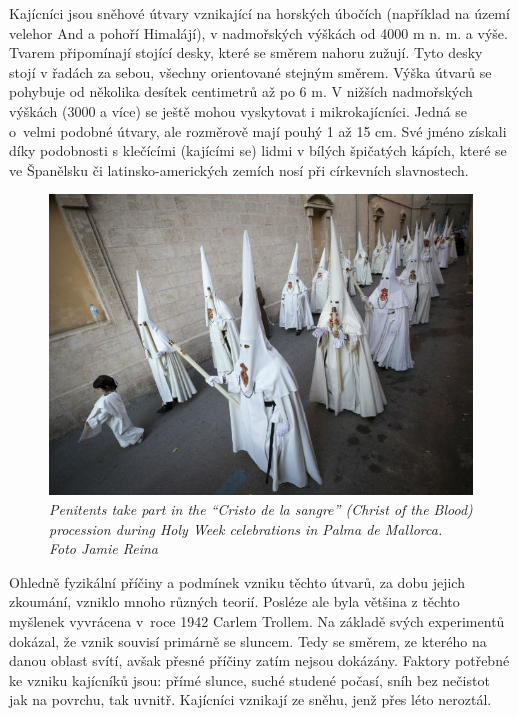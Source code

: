 Kajícníci jsou sněhové útvary vznikající na horských úbočích (například na území velehor And a pohoří Himalájí\cite{Betterton2000FormationOS}), v nadmořských výškách od 4000 m n. m. a výše\cite{lliboitry_1954}.  Tvarem připomínají stojící desky, které se směrem nahoru zužují. Tyto desky stojí v řadách za sebou, všechny orientované stejným směrem. Výška útvarů se pohybuje od několika desítek centimetrů až po 6 m. V nižších nadmořských výškách (3000 a více) se ještě mohou vyskytovat i mikrokajícníci. Jedná se o~velmi podobné útvary, ale rozměrově mají pouhý 1 až 15 cm. Své jméno získali díky podobnosti s klečícími (kajícími se) lidmi v bílých špičatých kápích, které se ve Španělsku či latinsko-amerických zemích nosí při církevních slavnostech.  
\begin{figure}[h]\centering
\includegraphics[width=0.6\linewidth]{obrazky-figures/penitetntsSpain.jpg}\hfill
  \caption{\textit{Penitents take part in the “Cristo de la sangre” (Christ of the Blood) procession during Holy Week celebrations in Palma de Mallorca. Foto Jamie Reina}\cite{penitentsSpain}}
  \label{2d}
\end{figure}

Ohledně fyzikální příčiny a podmínek vzniku těchto útvarů, za dobu jejich zkoumání, vzniklo mnoho různých teorií\cite{lliboitry_1954}. Posléze ale byla většina z těchto myšlenek vyvrácena v~roce 1942 Carlem Trollem. Na základě svých experimentů dokázal, že vznik souvisí primárně se sluncem. Tedy se směrem, ze kterého na danou oblast svítí, avšak přesné příčiny zatím nejsou dokázány\cite{lliboitry_1954}. Faktory potřebné ke vzniku kajícníků jsou: přímé slunce, suché studené počasí, sníh bez nečistot jak na povrchu, tak uvnitř\cite{Betterton2000FormationOS}. Kajícníci vznikají ze sněhu, jenž přes léto neroztál.

